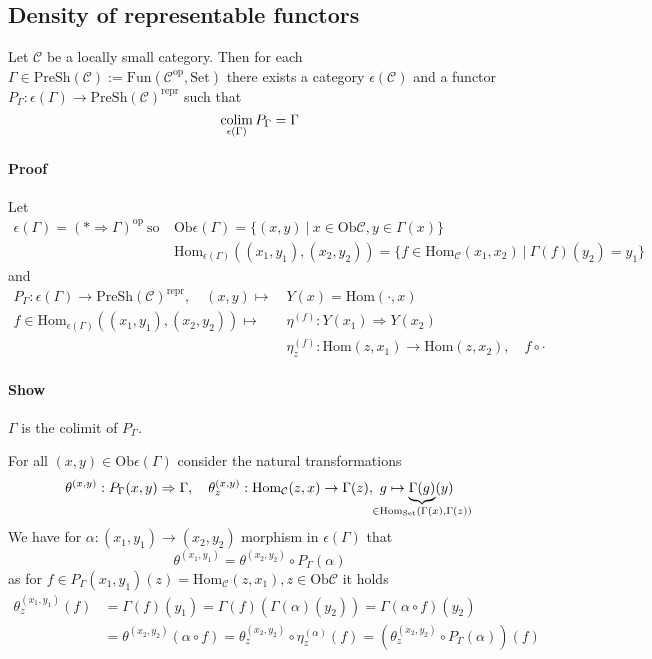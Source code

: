 
\subsection{Density of representable functors}
Let $\mathcal{C}$ be a locally small category. 
Then for each $\Gamma \in \mathrm{PreSh}(\mathcal{C}) := \mathrm{Fun}(\mathcal{C}^{\mathrm{op}}, \mathrm{Set})$ there exists a category $\epsilon(\mathcal{C})$ and a functor $P_\Gamma: \epsilon(\Gamma) \to \mathrm{PreSh}(\mathcal{C})^{\mathrm{repr}}$ such that
\begin{equation*}
    \operatorname*{colim}_{\epsilon(\Gamma)} P_\Gamma = \Gamma
\end{equation*}
\paragraph{Proof} Let
\begin{align*}
    \epsilon(\Gamma) = (* \Rightarrow \Gamma)^{\mathrm{op}} \ \text{so} \ &\mathrm{Ob}\epsilon(\Gamma) = \{ (x, y) \ | \ x \in \mathrm{Ob}\mathcal{C}, y \in \Gamma(x)\} \\
    &\mathrm{Hom}_{\epsilon(\Gamma)}((x_1, y_1), (x_2, y_2)) = \{ f \in \mathrm{Hom}_{\mathcal{C}}(x_1, x_2) \ | \ \Gamma(f)(y_2) = y_1 \}
\end{align*}
and
\begin{align*}
    P_\Gamma: \epsilon(\Gamma) \to \mathrm{PreSh}(\mathcal{C})^{\mathrm{repr}}, \quad (x, y) \mapsto \ &Y(x) = \mathrm{Hom}(\cdot, x) \\
    f \in \mathrm{Hom}_{\epsilon(\Gamma)}((x_1, y_1), (x_2, y_2)) \mapsto \ &\eta^{(f)}: Y(x_1) \Rightarrow Y(x_2) \\
    &\eta^{(f)}_z: \mathrm{Hom}(z, x_1) \to \mathrm{Hom}(z, x_2), \quad f \circ \cdot
\end{align*}
\paragraph{Show} $\Gamma$ is the colimit of $P_\Gamma$.

For all $(x, y) \in \mathrm{Ob}\epsilon(\Gamma)$ consider the natural transformations
\begin{align*}
    \theta^{(x, y)}: P_\Gamma(x, y) \Rightarrow \Gamma, \quad \theta^{(x, y)}_z: \mathrm{Hom}_{\mathcal{C}}(z, x) \to \Gamma(z), \ g \mapsto \underbrace{\Gamma(g)}_{\mathclap{\in \mathrm{Hom}_{\mathrm{Set}}(\Gamma(x), \Gamma(z))}}(y)
\end{align*}
We have for $\alpha: (x_1, y_1) \to (x_2, y_2)$ morphism in $\epsilon(\Gamma)$ that
\begin{equation*}
    \theta^{(x_1, y_1)} = \theta^{(x_2, y_2)} \circ P_\Gamma(\alpha)
\end{equation*}
as for $f \in P_\Gamma(x_1, y_1)(z) = \mathrm{Hom}_{\mathcal{C}}(z, x_1), z \in \mathrm{Ob}\mathcal{C}$ it holds
\begin{align*}
    \theta^{(x_1, y_1)}_z(f) &= \Gamma(f)(y_1) = \Gamma(f)(\Gamma(\alpha)(y_2)) = \Gamma(\alpha \circ f)(y_2) \\
    &= \theta^{(x_2, y_2)}(\alpha \circ f) = \theta^{(x_2, y_2)}_z \circ \eta^{(\alpha)}_z(f) = (\theta^{(x_2, y_2)}_z \circ P_\Gamma(\alpha))(f)
\end{align*} 

